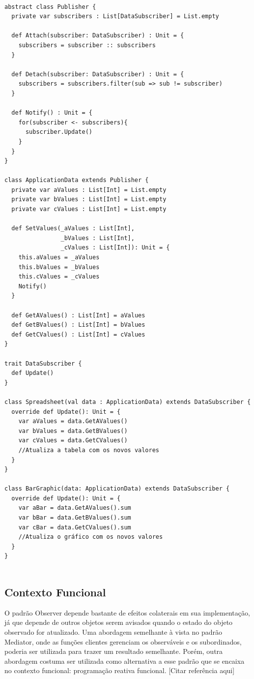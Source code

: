 \begin{lstlisting}[caption={Observer Orientação a Objetos},label=ooobserver]

abstract class Publisher {
  private var subscribers : List[DataSubscriber] = List.empty

  def Attach(subscriber: DataSubscriber) : Unit = {
    subscribers = subscriber :: subscribers
  }

  def Detach(subscriber: DataSubscriber) : Unit = {
    subscribers = subscribers.filter(sub => sub != subscriber)
  }

  def Notify() : Unit = {
    for(subscriber <- subscribers){
      subscriber.Update()
    }
  }
}

class ApplicationData extends Publisher {
  private var aValues : List[Int] = List.empty
  private var bValues : List[Int] = List.empty
  private var cValues : List[Int] = List.empty

  def SetValues(_aValues : List[Int],
                _bValues : List[Int],
                _cValues : List[Int]): Unit = {
    this.aValues = _aValues
    this.bValues = _bValues
    this.cValues = _cValues
    Notify()
  }

  def GetAValues() : List[Int] = aValues
  def GetBValues() : List[Int] = bValues
  def GetCValues() : List[Int] = cValues
}

trait DataSubscriber {
  def Update()
}

class Spreadsheet(val data : ApplicationData) extends DataSubscriber {
  override def Update(): Unit = {
    var aValues = data.GetAValues()
    var bValues = data.GetBValues()
    var cValues = data.GetCValues()
    //Atualiza a tabela com os novos valores
  }
}

class BarGraphic(data: ApplicationData) extends DataSubscriber {
  override def Update(): Unit = {
    var aBar = data.GetAValues().sum
    var bBar = data.GetBValues().sum
    var cBar = data.GetCValues().sum
    //Atualiza o gráfico com os novos valores
  }
}
    
\end{lstlisting}

\subsection*{Contexto Funcional}

O padrão Observer depende bastante de 
efeitos colaterais em sua implementação, 
já que depende de outros objetos serem avisados 
quando o estado do objeto observado for 
atualizado. Uma abordagem semelhante à vista 
no padrão Mediator, onde as funções clientes 
gerenciam os observáveis e os subordinados, 
poderia ser utilizada para trazer um resultado 
semelhante. Porém, outra abordagem costuma ser 
utilizada como alternativa a esse padrão que 
se encaixa no contexto funcional: programação 
reativa funcional. [Citar referência aqui]

\begin{lstlisting}[caption={Observer Funcional},label=fpobserver]
    

    
\end{lstlisting}
